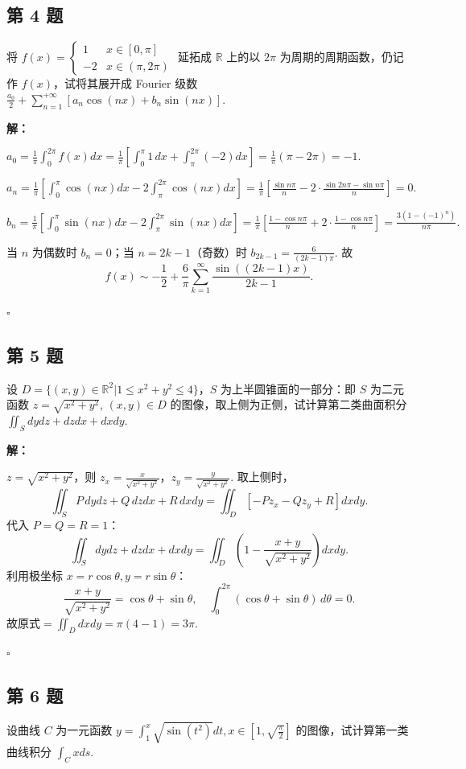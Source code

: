 \documentclass[12pt,a4paper]{article}
\newenvironment{sol}[1][解]{%
  \par\medskip\noindent\textbf{#1：}\itshape\par\noindent\ignorespaces
}{%
  \par\hfill$\square$\par\medskip
}
\begin{document}
\subsection*{第 4 题}
将 $f(x)=
\begin{cases}1 & x\in[0,\pi] \\ -2 & x\in(\pi,2\pi)
\end{cases}$ 延拓成 $\mathbb{R}$ 上的以 $2\pi$ 为周期的周期函数，仍记作 $f(x)$，试将其展开成
Fourier 级数 $\frac{a_0}{2}+\sum_{n=1}^{+\infty}[a_n\cos(nx)+b_n\sin(nx)]$.

\begin{sol}
  $a_0=\frac{1}{\pi}\int_0^{2\pi}f(x)dx=\frac{1}{\pi}\left[\int_0^{\pi}1\,dx+\int_{\pi}^{2\pi}(-2)dx\right]=\frac{1}{\pi}(\pi-2\pi)=-1.$

  $a_n=\frac{1}{\pi}\left[\int_0^{\pi}\cos(nx)dx-2\int_{\pi}^{2\pi}\cos(nx)dx\right]=\frac{1}{\pi}\left[\frac{\sin
  n\pi}{n}-2\cdot\frac{\sin 2n\pi-\sin n\pi}{n}\right]=0.$

  $b_n=\frac{1}{\pi}\left[\int_0^{\pi}\sin(nx)dx-2\int_{\pi}^{2\pi}\sin(nx)dx\right]=\frac{1}{\pi}\left[\frac{1-\cos
  n\pi}{n}+2\cdot\frac{1-\cos n\pi}{n}\right]=\frac{3(1-(-1)^n)}{n\pi}.$

  当 $n$ 为偶数时 $b_n=0$；当 $n=2k-1$（奇数）时 $b_{2k-1}=\frac{6}{(2k-1)\pi}$. 故
  $$f(x)\sim
  -\frac{1}{2}+\frac{6}{\pi}\sum_{k=1}^{\infty}\frac{\sin((2k-1)x)}{2k-1}.$$

\end{sol}
\subsection*{第 5 题}
设 $D=\{(x,y)\in\mathbb{R}^2|1\le x^2+y^2\le 4\}$，$S$ 为上半圆锥面的一部分：即 $S$
为二元函数 $z=\sqrt{x^2+y^2}$, $(x,y)\in D$ 的图像，取上侧为正侧，试计算第二类曲面积分
$\iint_{S}dydz+dzdx+dxdy$.

\begin{sol}$z=\sqrt{x^2+y^2}$，则
  $z_x=\frac{x}{\sqrt{x^2+y^2}}$，$z_y=\frac{y}{\sqrt{x^2+y^2}}$. 取上侧时，
  $$\iint_S P\,dydz+Q\,dzdx+R\,dxdy=\iint_D\left[-Pz_x-Qz_y+R\right]dxdy.$$
  代入 $P=Q=R=1$：
  $$\iint_S
  dydz+dzdx+dxdy=\iint_D\left(1-\frac{x+y}{\sqrt{x^2+y^2}}\right)dxdy.$$
  利用极坐标 $x=r\cos\theta,y=r\sin\theta$：
  $$\frac{x+y}{\sqrt{x^2+y^2}}=\cos\theta+\sin\theta,\quad\int_0^{2\pi}(\cos\theta+\sin\theta)\,d\theta=0.$$
  故原式$=\iint_D dxdy=\pi(4-1)=3\pi.$

\end{sol}
\subsection*{第 6 题}
设曲线 $C$ 为一元函数 $y=\int_{1}^{x}\sqrt{\sin(t^2)}dt,
x\in[1,\sqrt{\frac{\pi}{2}}]$ 的图像，试计算第一类曲线积分 $\int_{C}xds$.
\end{document}
